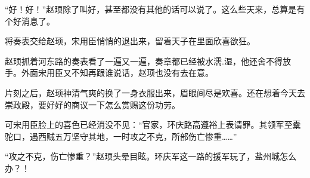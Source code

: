 “好！好！”赵顼除了叫好，甚至都没有其他的话可以说了。这么些天来，总算是有个好消息了。

将奏表交给赵顼，宋用臣悄悄的退出来，留着天子在里面欣喜欲狂。

赵顼抓着河东路的奏表看了一遍又一遍，奏章都已经被水濡.湿，他还舍不得放手。外面宋用臣又不知再跟谁说话，赵顼也没有去在意。

片刻之后，赵顼神清气爽的换了一身衣服出来，眉眼间尽是欢喜。还在想着今天去崇政殿，要好好的商议一下怎么赏赐这份功劳。

可宋用臣脸上的喜色已经消没不见：“官家，环庆路高遵裕上表请罪。其领军至櫜驼口，遇西贼五万坚守其地，一时攻之不克，所部伤亡惨重……”

“攻之不克，伤亡惨重？”赵顼头晕目眩。环庆军这一路的援军玩了，盐州城怎么办？！

